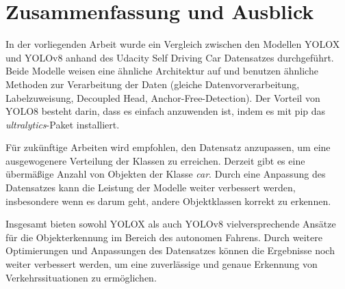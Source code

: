 \chapter{Zusammenfassung und Ausblick}\label{chap:conclusion}
In der vorliegenden Arbeit wurde ein Vergleich zwischen den Modellen YOLOX und YOLOv8 anhand des Udacity Self Driving Car Datensatzes durchgeführt. Beide Modelle weisen eine ähnliche Architektur auf und benutzen ähnliche Methoden zur Verarbeitung der Daten (gleiche Datenvorverarbeitung, Labelzuweisung, Decoupled Head, Anchor-Free-Detection). Der Vorteil von YOLO8 besteht darin, dass es einfach anzuwenden ist, indem es mit pip das  \textit{ultralytics}-Paket installiert.

Für zukünftige Arbeiten wird empfohlen, den Datensatz anzupassen, um eine ausgewogenere Verteilung der Klassen zu erreichen. Derzeit gibt es eine übermäßige Anzahl von Objekten der Klasse \textit{car}. Durch eine Anpassung des Datensatzes kann die Leistung der Modelle weiter verbessert werden, insbesondere wenn es darum geht, andere Objektklassen korrekt zu erkennen.

Insgesamt bieten sowohl YOLOX als auch YOLOv8 vielversprechende Ansätze für die Objekterkennung im Bereich des autonomen Fahrens. Durch weitere Optimierungen und Anpassungen des Datensatzes können die Ergebnisse noch weiter verbessert werden, um eine zuverlässige und genaue Erkennung von Verkehrssituationen zu ermöglichen.